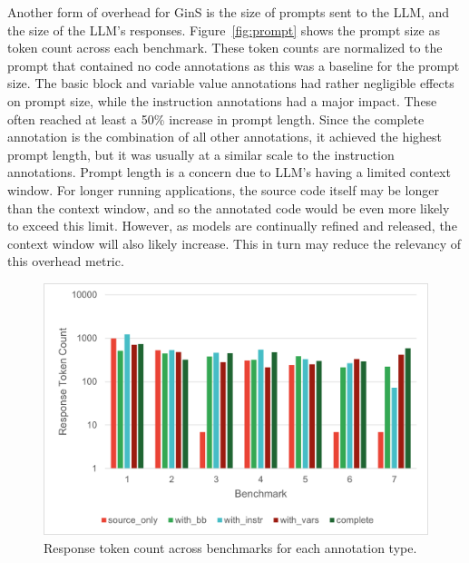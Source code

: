 \documentclass[sigconf]{acmart}
\begin{document}
Another form of overhead for GinS is the size of prompts sent to the LLM, and the size of the LLM's responses.
Figure~\ref{fig:prompt} shows the prompt size as token count across each benchmark.
These token counts are normalized to the prompt that contained no code annotations as this was a baseline for the prompt size.
The basic block and variable value annotations had rather negligible effects on prompt size, while the instruction annotations had a major impact.
These often reached at least a 50\% increase in prompt length.
Since the complete annotation is the combination of all other annotations, it achieved the highest prompt length, but it was usually at a similar scale to the instruction annotations.
Prompt length is a concern due to LLM's having a limited context window.
For longer running applications, the source code itself may be longer than the context window, and so the annotated code would be even more likely to exceed this limit.
However, as models are continually refined and released, the context window will also likely increase.
This in turn may reduce the relevancy of this overhead metric.

\begin{figure}
    \centering
    \includegraphics[width=1\linewidth]{images/ResponseCost.png}
    \caption{Response token count across benchmarks for each annotation type.}
    \label{fig:response}
\end{figure}
\end{document}
